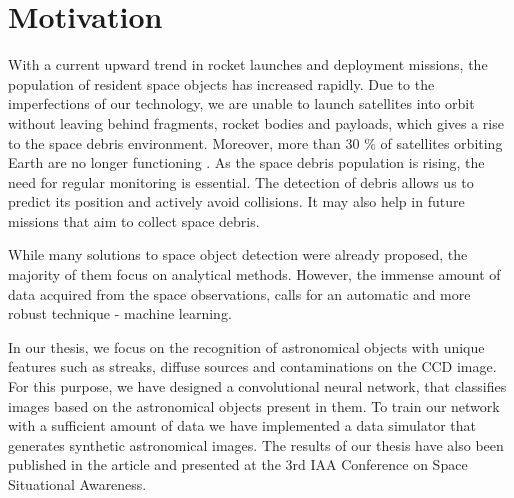 \chapter*{Motivation}

With a current upward trend in rocket launches and deployment missions, the population of resident space objects has increased rapidly. Due to the imperfections of our technology, we are unable to launch satellites into orbit without leaving behind fragments, rocket bodies and payloads, which gives a rise to the space debris environment. Moreover, more than 30 \% of satellites orbiting Earth are no longer functioning \cite{ESAarticle3}. As the space debris population is rising, the need for regular monitoring is essential. The detection of debris allows us to predict its position and actively avoid collisions. It may also help in future missions that aim to collect space debris. 

While many solutions to space object detection were already proposed, the majority of them focus on analytical methods. However, the immense amount of data acquired from the space observations, calls for an automatic and more robust technique - machine learning. 

In our thesis, we focus on the recognition of astronomical objects with unique features such as streaks, diffuse sources and contaminations on the CCD image. 
For this purpose, we have designed a convolutional neural network, that classifies images based on the astronomical objects present in them. To train our network with a sufficient amount of data we have implemented a data simulator that generates synthetic astronomical images. The results of our thesis have also been published in the article \cite{soi2022} and presented at the 3rd IAA Conference on Space Situational Awareness.  





